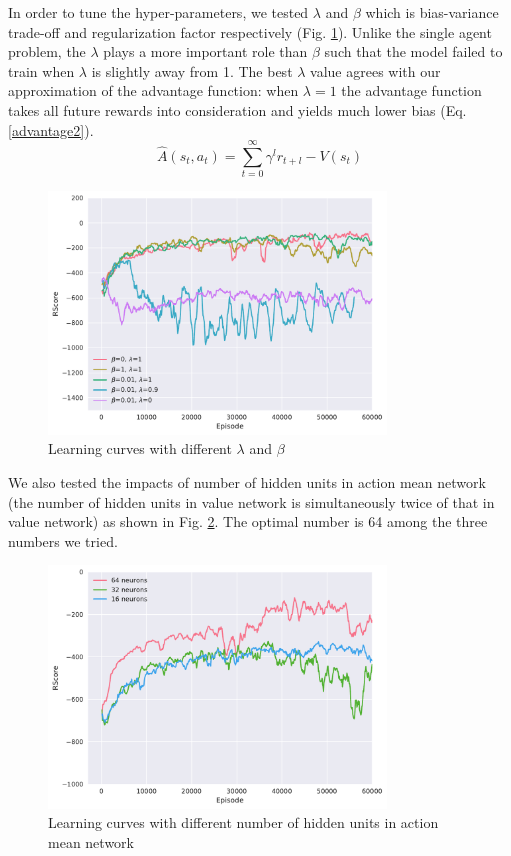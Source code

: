 \documentclass[12pt, letter]{article}
\begin{document}
In order to tune the hyper-parameters, we tested $\lambda$ and $\beta$ which is bias-variance trade-off and regularization factor respectively (Fig. \ref{fig:params}). Unlike the single agent problem, the $\lambda$ plays a more important role than $\beta$ such that the model failed to train when $\lambda$ is slightly away from 1. The best $\lambda$ value agrees with our approximation of the advantage function: when $\lambda=1$ the advantage function takes all future rewards into consideration and yields much lower bias (Eq. \ref{advantage2}).
\begin{equation}
\hat{A}(s_t, a_t) = \sum^{\infty}_{t=0} \gamma^l r_{t+l} - V(s_t)
\label{advantage2}
\end{equation}

\begin{figure}[htbp]
	\centering
	\includegraphics[width=0.8\textwidth]{figures/lambda_beta_comparison.pdf}
	\caption{Learning curves with different $\lambda$ and $\beta$}
	\label{fig:params}
\end{figure}

We also tested the impacts of number of hidden units in action mean network (the number of hidden units in value network is simultaneously twice of that in value network) as shown in Fig. \ref{fig:units}. The optimal number is 64 among the three numbers we tried.

\begin{figure}[htbp]
	\centering
	\includegraphics[width=0.8\textwidth]{figures/neurons_comparison.pdf}
	\caption{Learning curves with different number of hidden units in action mean network}
	\label{fig:units}
\end{figure}
\end{document}
